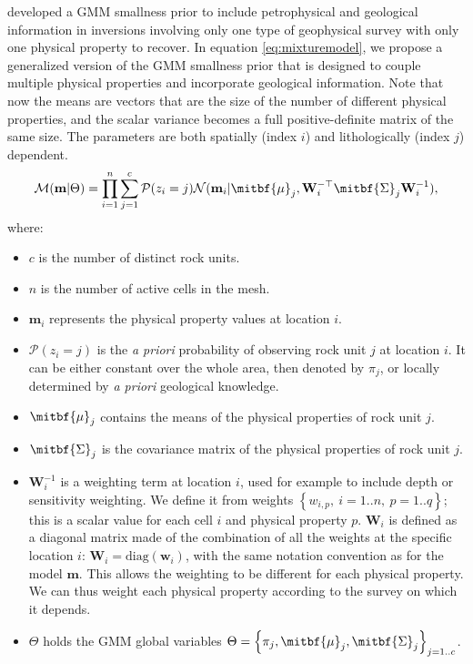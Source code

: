 \documentclass[extra, mreferee]{gji_joint} %
\begin{document}
\citet{ggz389} developed a GMM smallness prior to include petrophysical and geological information in inversions involving only one type of geophysical survey with only one physical property to recover. In equation \eqref{eq:mixturemodel}, we propose a generalized version of the GMM smallness prior that is designed to couple multiple physical properties and incorporate geological information. Note that now the means are vectors that are the size of the number of different physical properties, and the scalar variance becomes a full positive-definite matrix of the same size. The parameters are both spatially (index $i$) and lithologically (index $j$) dependent.
\begin{equation}
\mathcal{M}(\mathbf{m}|\Theta) = \prod_{i=1}^n \sum_{j=1}^c \mathcal{P}(z_{i}=j)\mathcal{N}(\mathbf{m}_i|\mitbf{\mu}_j, \mathbf{W}_i^{-\top}\mitbf{\Sigma}_j\mathbf{W}_i^{-1}),
\label{eq:mixturemodel}
\end{equation}
where:
\newpage
\begin{itemize}
\item $c$ is the number of distinct rock units.
\item $n$ is the number of active cells in the mesh.
\item $\mathbf{m}_i$ represents the physical property values at location $i$.
\item $\mathcal{P}(z_{i}=j)$ is the \textit{a priori} probability of observing rock unit $j$ at location $i$. It can be either constant over the whole area, then denoted by $\pi_j$, or locally determined by \textit{a priori} geological knowledge.
\item $\mitbf{\mu}_j$ contains the means of the physical properties of rock unit $j$.
\item $\mitbf{\Sigma}_j$ is the covariance matrix of the physical properties of rock unit $j$.
\item $\mathbf{W}_i^{-1}$ is a weighting term at location $i$, used for example to include depth or sensitivity weighting. We define it from weights $\left\{{w}_{i, p}, ~i=1..n, ~p=1..q\right\}$; this is a scalar value for each cell $i$ and physical property $p$. $\mathbf{W}_i$ is defined as a diagonal matrix made of the combination of all the weights at the specific location $i$: $\mathbf{W}_i = \text{diag}(\mathbf{w}_{i})$, with the same notation convention as for the model $\mathbf{m}$. This allows the weighting to be different for each physical property. We can thus weight each physical property according to the survey on which it depends.
\item $\Theta$ holds the GMM global variables $\Theta= \left\{\pi_j, \mitbf{\mu}_j, \mitbf{\Sigma}_j\right\}_{j=1..c}$.
\end{itemize}
\end{document}
